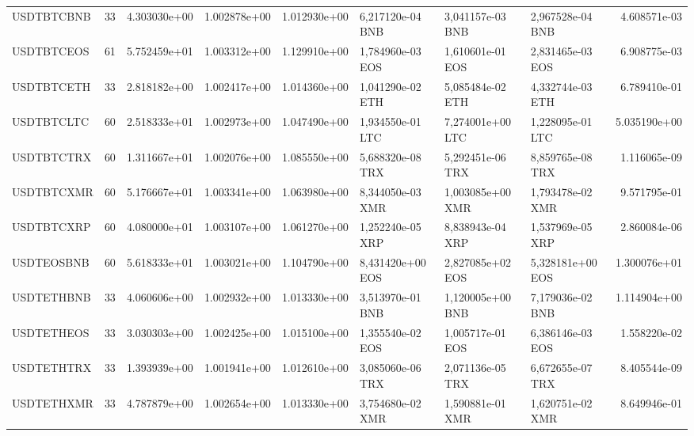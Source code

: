 \begin{tabular}{lrrrrlllr}
 USDTBTCBNB &    33 &   4.303030e+00 &   1.002878e+00 &    1.012930e+00 &  6,217120e-04 BNB &   3,041157e-03 BNB &           2,967528e-04 BNB &                      4.608571e-03 \\
 USDTBTCEOS &    61 &   5.752459e+01 &   1.003312e+00 &    1.129910e+00 &  1,784960e-03 EOS &   1,610601e-01 EOS &           2,831465e-03 EOS &                      6.908775e-03 \\
 USDTBTCETH &    33 &   2.818182e+00 &   1.002417e+00 &    1.014360e+00 &  1,041290e-02 ETH &   5,085484e-02 ETH &           4,332744e-03 ETH &                      6.789410e-01 \\
 USDTBTCLTC &    60 &   2.518333e+01 &   1.002973e+00 &    1.047490e+00 &  1,934550e-01 LTC &   7,274001e+00 LTC &           1,228095e-01 LTC &                      5.035190e+00 \\
 USDTBTCTRX &    60 &   1.311667e+01 &   1.002076e+00 &    1.085550e+00 &  5,688320e-08 TRX &   5,292451e-06 TRX &           8,859765e-08 TRX &                      1.116065e-09 \\
 USDTBTCXMR &    60 &   5.176667e+01 &   1.003341e+00 &    1.063980e+00 &  8,344050e-03 XMR &   1,003085e+00 XMR &           1,793478e-02 XMR &                      9.571795e-01 \\
 USDTBTCXRP &    60 &   4.080000e+01 &   1.003107e+00 &    1.061270e+00 &  1,252240e-05 XRP &   8,838943e-04 XRP &           1,537969e-05 XRP &                      2.860084e-06 \\
 USDTEOSBNB &    60 &   5.618333e+01 &   1.003021e+00 &    1.104790e+00 &  8,431420e+00 EOS &   2,827085e+02 EOS &           5,328181e+00 EOS &                      1.300076e+01 \\
 USDTETHBNB &    33 &   4.060606e+00 &   1.002932e+00 &    1.013330e+00 &  3,513970e-01 BNB &   1,120005e+00 BNB &           7,179036e-02 BNB &                      1.114904e+00 \\
 USDTETHEOS &    33 &   3.030303e+00 &   1.002425e+00 &    1.015100e+00 &  1,355540e-02 EOS &   1,005717e-01 EOS &           6,386146e-03 EOS &                      1.558220e-02 \\
 USDTETHTRX &    33 &   1.393939e+00 &   1.001941e+00 &    1.012610e+00 &  3,085060e-06 TRX &   2,071136e-05 TRX &           6,672655e-07 TRX &                      8.405544e-09 \\
 USDTETHXMR &    33 &   4.787879e+00 &   1.002654e+00 &    1.013330e+00 &  3,754680e-02 XMR &   1,590881e-01 XMR &           1,620751e-02 XMR &                      8.649946e-01 \\

\end{tabular}

